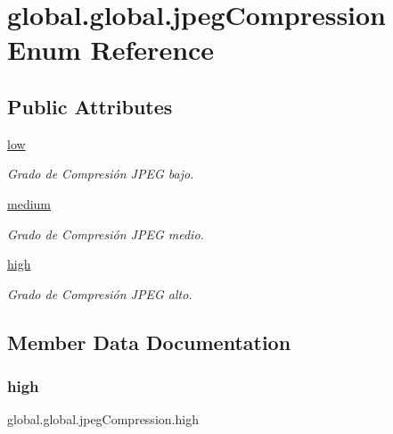 \hypertarget{enumglobal_1_1global_1_1jpegCompression}{}\section{global.\+global.\+jpeg\+Compression Enum Reference}
\label{enumglobal_1_1global_1_1jpegCompression}
\subsection*{Public Attributes}
\begin{DoxyCompactItemize}
\item 
\hyperlink{enumglobal_1_1global_1_1jpegCompression_a4e03840e4d33824d24f3245053250850}{low}
\begin{DoxyCompactList}\small\item\em Grado de Compresión J\+P\+EG bajo. \end{DoxyCompactList}\item 
\hyperlink{enumglobal_1_1global_1_1jpegCompression_ac86c77dbe46a259b0a4cd45ea7c5e7dd}{medium}
\begin{DoxyCompactList}\small\item\em Grado de Compresión J\+P\+EG medio. \end{DoxyCompactList}\item 
\hyperlink{enumglobal_1_1global_1_1jpegCompression_adf313d2570705b78573a87a97999dd9f}{high}
\begin{DoxyCompactList}\small\item\em Grado de Compresión J\+P\+EG alto. \end{DoxyCompactList}\end{DoxyCompactItemize}


\subsection{Member Data Documentation}
\mbox{\label{enumglobal_1_1global_1_1jpegCompression_adf313d2570705b78573a87a97999dd9f}} 
\subsubsection{\texorpdfstring{high}{high}}
{\footnotesize\ttfamily global.\+global.\+jpeg\+Compression.\+high}



